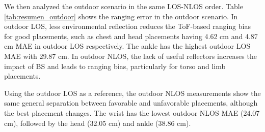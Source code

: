 We then analyzed the outdoor scenario in the same LOS-NLOS order. Table \ref{tab:resumen_outdoor} shows the ranging error in the outdoor scenario. In outdoor LOS, less environmental reflection reduces the ToF-based ranging bias for good placements, such as chest and head placements having 4.62 cm and 4.87 cm MAE in outdoor LOS respectively. The ankle has the highest outdoor LOS MAE with 29.87 cm. In outdoor NLOS, the lack of useful reflectors increases the impact of BS and leads to ranging bias, particularly for torso and limb placements.

Using the outdoor LOS as a reference, the outdoor NLOS measurements show the same general separation between favorable and unfavorable placements, although the best placement changes. The wrist has the lowest outdoor NLOS MAE (24.07 cm), followed by the head (32.05 cm) and ankle (38.86 cm).

\begin{center}
\label{tab:resumen_outdoor}
\end{center}


